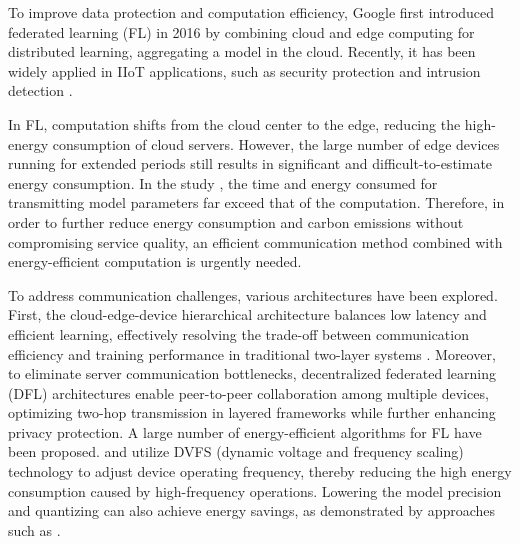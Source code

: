 \documentclass[journal]{IEEEtran}
\begin{document}


To improve data protection and computation efficiency, Google first introduced federated learning (FL) in 2016 \cite{fedavg_google} by combining cloud and edge computing for distributed learning, aggregating a model in the cloud. Recently, it has been widely applied in IIoT applications, such as security protection \cite{salim2024fl_securityguard} and intrusion detection \cite{rashid2023federated_invasion}. 

In FL, computation shifts from the cloud center to the edge, reducing the high-energy consumption of cloud servers. However, the large number of edge devices running for extended periods still results in significant and difficult-to-estimate energy consumption. In the study \cite{liu_hierarchical_2023}, the time and energy consumed for transmitting model parameters far exceed that of the computation. Therefore, in order to further reduce energy consumption and carbon emissions without compromising service quality, an efficient communication method combined with energy-efficient computation is urgently needed.

To address communication challenges, various architectures have been explored. First, the cloud-edge-device hierarchical architecture \cite{abdellatif2022communication_hierarchical,zhou2023hierarchical} balances low latency and efficient learning, effectively resolving the trade-off between communication efficiency and training performance in traditional two-layer systems \cite{liu_hierarchical_2023}. Moreover, to eliminate server communication bottlenecks, decentralized federated learning (DFL) architectures \cite{kalra2023decentralized,al2023decentralized_D2D} enable peer-to-peer collaboration among multiple devices, optimizing two-hop transmission in layered frameworks while further enhancing privacy protection. A large number of energy-efficient algorithms for FL have been proposed. \cite{chen_eefl_2023} and \cite{rashid2023federated_invasion} utilize DVFS (dynamic voltage and frequency scaling) technology to adjust device operating frequency, thereby reducing the high energy consumption caused by high-frequency operations. Lowering the model precision and quantizing can also achieve energy savings, as demonstrated by approaches such as \cite{de2023hed_quantize,chen2022energy_quantize}. 
\end{document}

